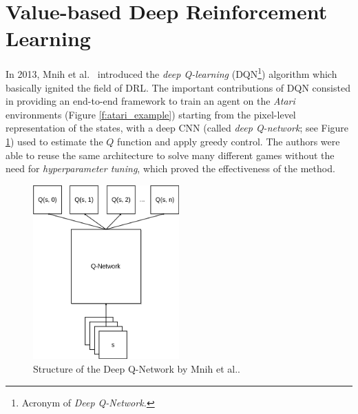 \section{Value-based Deep Reinforcement Learning} \label{SOA:value}
In 2013, Mnih et al.\ \cite{mnih2015human} introduced the \textit{deep 
Q-learning} (DQN\footnote{Acronym of \textit{Deep Q-Network.}}) algorithm which 
basically ignited the field of DRL.
The important contributions of DQN consisted in providing an end-to-end 
framework to train an agent on the \textit{Atari} environments (Figure \ref{f:atari_example})
starting from the pixel-level representation of the states, with a deep CNN 
(called \textit{deep Q-network}; see Figure \ref{f:dqn_mnih}) used to estimate 
the $Q$ function and apply greedy control. 
The authors were able to reuse the same architecture to solve many different 
games without the need for \textit{hyperparameter tuning}, which proved the 
effectiveness of the method.
%
\begin{figure}[h]
    \includegraphics[width=0.5\textwidth]{pictures/dqn}
    \centering
    \caption[Structure of the Deep Q-Network by Mnih et al.\ ]{Structure of the 
	    Deep Q-Network by Mnih et al..}
    \label{f:dqn_mnih}
\end{figure}
%

